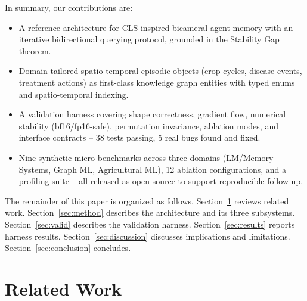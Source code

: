 \documentclass{article}
\begin{document}
In summary, our contributions are:
\begin{itemize}
  \item A reference architecture for CLS-inspired bicameral agent memory with
        an iterative bidirectional querying protocol, grounded in the Stability
        Gap theorem.
  \item Domain-tailored spatio-temporal episodic objects (crop cycles, disease
        events, treatment actions) as first-class knowledge graph entities with
        typed enums and spatio-temporal indexing.
  \item A validation harness covering shape correctness, gradient flow, numerical
        stability (bf16/fp16-safe), permutation invariance, ablation modes, and
        interface contracts -- 38 tests passing, 5 real bugs found and fixed.
  \item Nine synthetic micro-benchmarks across three domains (LM/Memory Systems,
        Graph ML, Agricultural ML), 12 ablation configurations, and a profiling
        suite -- all released as open source to support reproducible follow-up.
\end{itemize}

The remainder of this paper is organized as follows. Section~\ref{sec:related}
reviews related work. Section~\ref{sec:method} describes the architecture and its
three subsystems. Section~\ref{sec:valid} describes the validation harness.
Section~\ref{sec:results} reports harness results. Section~\ref{sec:discussion}
discusses implications and limitations. Section~\ref{sec:conclusion} concludes.

\section{Related Work}
\label{sec:related}
\end{document}
